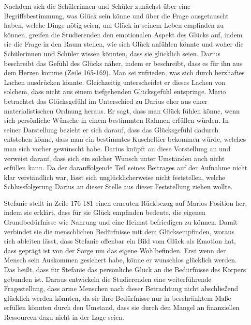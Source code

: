 Nachdem sich die Schülerinnen und Schüler zunächst über eine Begriffsbestimmung, was Glück sein könne und über die Frage ausgetauscht haben, welche Dinge nötig seien, um Glück in seinem Leben empfinden zu können, greifen die Studierenden den emotionalen Aspekt des Glücks auf, indem sie die Frage in den Raum stellen, wie sich Glück anfühlen könnte und woher die Schülerinnen und Schüler wissen könnten, dass sie glücklich seien. 
Darius beschreibt das Gefühl des Glücks näher, indem er beschreibt, dass es für ihn aus dem Herzen komme (Zeile 165-169). 
Man sei zufrieden, was sich durch herzhaftes Lachen ausdrücken könnte. 
Gleichzeitig unterscheidet er dieses Lachen von solchem, dass nicht aus einem tiefgehenden Glücksgefühl entspringe. 
Mario betrachtet das Glücksgefühl im Unterschied zu Darius eher aus einer materialistischen Ordnung heraus. 
Er sagt, dass man Glück fühlen könne, wenn sich persönliche Wünsche in einem bestimmten Rahmen erfüllen würden. 
In seiner Darstellung bezieht er sich darauf, dass das Glücksgefühl dadurch entstehen könne, dass man ein bestimmtes Kuscheltier bekommen würde, welches man sich vorher gewünscht habe. 
Darius knüpft an diese Vorstellung an und verweist darauf, dass sich ein solcher Wunsch unter Umständen auch nicht erfüllen kann. 
Da der darauffolgende Teil seines Beitrages auf der Aufnahme nicht klar verständlich war, lässt sich unglücklicherweise nicht feststellen, welche Schlussfolgerung Darius an dieser Stelle aus dieser Feststellung ziehen wollte. 

Stefanie stellt in Zeile 176-181 einen erneuten Rückbezug auf Marios Position her, indem sie erklärt, dass für sie Glück empfinden bedeute, die eigenen Grundbedürfnisse wie Nahrung und eine Heimat befriedigen zu können. 
Damit verbindet sie die menschlichen Bedürfnisse mit dem Glücksempfinden, woraus sich ableiten lässt, dass Stefanie offenbar ein Bild vom Glück als Emotion hat, dass geprägt ist von der Sorge um das eigene Wohlbefinden. 
Erst wenn der Mensch sein Auskommen gesichert habe, könne er wunschlos glücklich werden. 
Das heißt, dass für Stefanie das persönliche Glück an die Bedürfnisse des Körpers gebunden ist. 
Daraus entwickeln die Studierenden eine weiterführende Fragestellung, dass arme Menschen nach dieser Betrachtung nicht abschließend glücklich werden könnten, da sie ihre Bedürfnisse nur in beschränktem Maße erfüllen könnten durch den Umstand, dass sie durch den Mangel an finanziellen Ressourcen dazu nicht in der Lage seien. 

